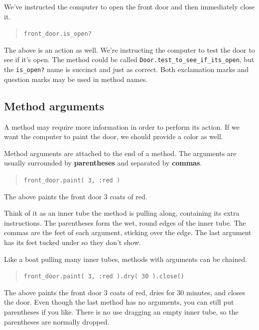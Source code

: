 \documentclass[10pt,twoside]{report}
\begin{document}
We've instructed the computer to open the front door and then
immediately close it.

\begin{quote}
\lstinline[breaklines=true]|front_door.is_open?|\end{quote}


The above is an action as well.  We're instructing the computer to
test the door to see if it's open. The method could be called
\lstinline[breaklines=true]|Door.test_to_see_if_its_open|, but the
\lstinline[breaklines=true]|is_open?| name is succinct and just as
correct.  Both exclamation marks and question marks may be used in
method names.



\subsection{Method arguments}



A method may require more information in order to perform its action.
If we want the computer to paint the door, we should provide a color
as well.

Method arguments are attached to the end of a method.  The arguments
are usually surrounded by {\bf parentheses} and separated by {\bf
  commas}.

\begin{quote}
\lstinline[breaklines=true]|front_door.paint( 3, :red )|\end{quote}


The above paints the front door 3 coats of red.

Think of it as an inner tube the method is pulling along, containing
its extra instructions. The parentheses form the wet, round edges of
the inner tube.  The commas are the feet of each argument, sticking
over the edge.  The last argument has its feet tucked under so they
don't show.

Like a boat pulling many inner tubes, methods with arguments can be
chained.

\begin{quote}
\lstinline[breaklines=true]|front_door.paint( 3, :red ).dry( 30 ).close()|\end{quote}


The above paints the front door 3 coats of red, dries for 30 minutes,
and closes the door.  Even though the last method has no arguments,
you can still put parentheses if you like.  There is no use dragging
an empty inner tube, so the parentheses are normally dropped.
\end{document}
